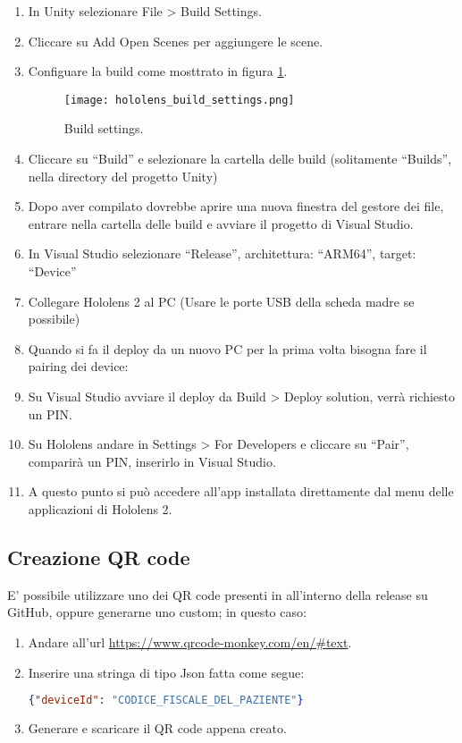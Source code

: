 \begin{enumerate}
    \item In Unity selezionare File > Build Settings.
    \item Cliccare su Add Open Scenes per aggiungere le scene.
    \item Configuare la build come mosttrato in figura \ref{pic:build-settings}.
    
    \begin{figure}[H]
        \texttt{[image: hololens\_build\_settings.png]}
        \centering
        \caption{\label{pic:build-settings}Build settings.}
    \end{figure}
    
    \item Cliccare su “Build” e selezionare la cartella delle build (solitamente “Builds”, nella directory del progetto Unity)
    \item Dopo aver compilato dovrebbe aprire una nuova finestra del gestore dei file, entrare nella cartella delle build e avviare il progetto di Visual Studio.
    \item In Visual Studio selezionare “Release”, architettura: “ARM64”, target: “Device” 
    \item Collegare Hololens 2 al PC (Usare le porte USB della scheda madre se possibile)
    \item Quando si fa il deploy da un nuovo PC per la prima volta bisogna fare il pairing dei device:
    \item Su Visual Studio avviare il deploy da Build > Deploy solution, verrà richiesto un PIN.
    \item Su Hololens andare in Settings > For Developers e cliccare su “Pair”, comparirà un PIN, inserirlo in Visual Studio.
    \item A questo punto si può accedere all’app installata direttamente dal menu delle applicazioni di Hololens 2.
\end{enumerate}

\subsection{Creazione QR code}
    E' possibile utilizzare uno dei QR code presenti in all'interno della release su GitHub, oppure generarne uno custom; in questo caso:
    \begin{enumerate}
        \item Andare all'url \url{https://www.qrcode-monkey.com/en/#text}.
        \item Inserire una stringa di tipo Json fatta come segue:
        \begin{lstlisting}[language=json, firstnumber=1]
{"deviceId": "CODICE_FISCALE_DEL_PAZIENTE"}
        \end{lstlisting}
        \item Generare e scaricare il QR code appena creato.
    \end{enumerate}

